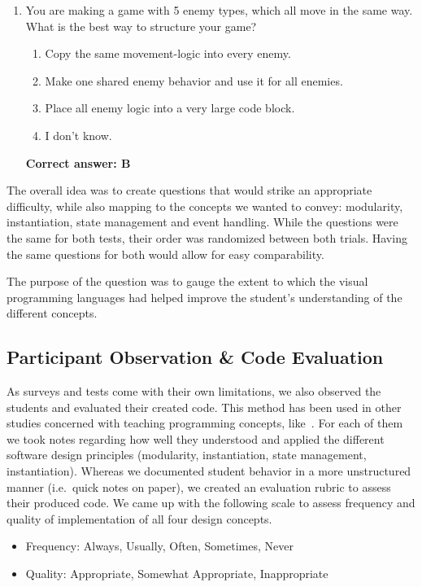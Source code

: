 \begin{enumerate}
    \item You are making a game with 5 enemy types, which all move in the same way.
    What is the best way to structure your game?
    \begin{enumerate}[label=\Alph*.]
		      \item Copy the same movement-logic into every enemy.
              \item Make one shared enemy behavior and use it for all enemies.
              \item Place all enemy logic into a very large code block.
              \item I don't know.
    \end{enumerate}
    \textbf{Correct answer: B}
\end{enumerate}

The overall idea was to create questions that would strike an appropriate difficulty, while also mapping to the concepts we wanted to convey: modularity, instantiation, state management and event handling.
While the questions were the same for both tests, their order was randomized between both trials.
Having the same questions for both would allow for easy comparability.

The purpose of the question was to gauge the extent to which the visual programming languages had helped improve the student's understanding of the different concepts.

\subsection{Participant Observation \& Code Evaluation}
As surveys and tests come with their own limitations, we also observed the students and evaluated their created code.
This method has been used in other studies concerned with teaching programming concepts, like~\cite{grover_assessing_2014}.
For each of them we took notes regarding how well they understood and applied the different software design principles (modularity, instantiation, state management, instantiation).
Whereas we documented student behavior in a more unstructured manner (i.e.\ quick notes on paper), we created an evaluation rubric to assess their produced code.
We came up with the following scale to assess frequency and quality of implementation of all four design concepts.

\begin{itemize}
    \item Frequency: Always, Usually, Often, Sometimes, Never
    \item Quality: Appropriate, Somewhat Appropriate, Inappropriate
\end{itemize}